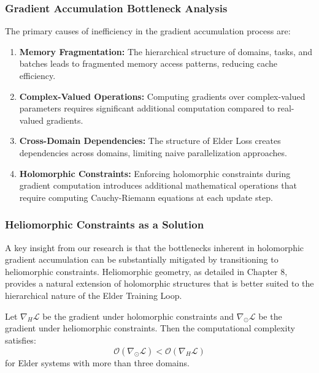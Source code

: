\subsubsection{Gradient Accumulation Bottleneck Analysis}

The primary causes of inefficiency in the gradient accumulation process are:

\begin{enumerate}
    \item \textbf{Memory Fragmentation:} The hierarchical structure of domains, tasks, and batches leads to fragmented memory access patterns, reducing cache efficiency.
    
    \item \textbf{Complex-Valued Operations:} Computing gradients over complex-valued parameters requires significant additional computation compared to real-valued gradients.
    
    \item \textbf{Cross-Domain Dependencies:} The structure of Elder Loss creates dependencies across domains, limiting naive parallelization approaches.
    
    \item \textbf{Holomorphic Constraints:} Enforcing holomorphic constraints during gradient computation introduces additional mathematical operations that require computing Cauchy-Riemann equations at each update step.
\end{enumerate}

\subsubsection{Heliomorphic Constraints as a Solution}

A key insight from our research is that the bottlenecks inherent in holomorphic gradient accumulation can be substantially mitigated by transitioning to heliomorphic constraints. Heliomorphic geometry, as detailed in Chapter 8, provides a natural extension of holomorphic structures that is better suited to the hierarchical nature of the Elder Training Loop.

\begin{theorem}
Let $\nabla_H \mathcal{L}$ be the gradient under holomorphic constraints and $\nabla_{\odot} \mathcal{L}$ be the gradient under heliomorphic constraints. Then the computational complexity satisfies:
\begin{equation}
\mathcal{O}(\nabla_{\odot} \mathcal{L}) < \mathcal{O}(\nabla_H \mathcal{L})
\end{equation}
for Elder systems with more than three domains.
\end{theorem}

